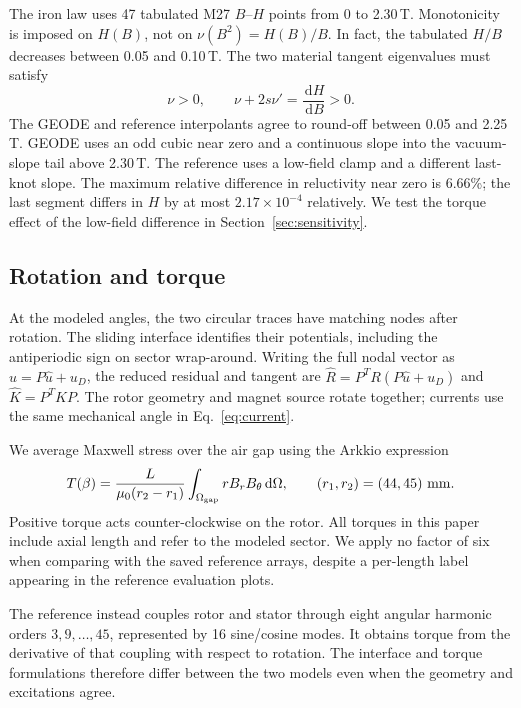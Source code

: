 \documentclass{anvil-paper}
\newcommand{\dd}{\,\mathrm{d}}
\begin{document}
The iron law uses 47 tabulated M27 $B$--$H$ points from 0 to 2.30\,T.
Monotonicity is imposed on $H(B)$, not on $\nu(B^2)=H(B)/B$.
In fact, the tabulated $H/B$ decreases between 0.05 and 0.10\,T.
The two material tangent eigenvalues must satisfy
\begin{equation}
 \nu>0,\qquad \nu+2s\nu'=\frac{\dd H}{\dd B}>0.
\end{equation}
The GEODE and reference interpolants agree to round-off between 0.05 and
2.25\,T. GEODE uses an odd cubic near zero and a continuous slope into the
vacuum-slope tail above 2.30\,T. The reference uses a low-field clamp and
a different last-knot slope. The maximum relative difference in
reluctivity near zero is 6.66\%; the last segment differs in $H$ by at
most $2.17\times10^{-4}$ relatively. We test the torque effect of the
low-field difference in Section~\ref{sec:sensitivity}.

\subsection{Rotation and torque}
At the modeled angles, the two circular traces have matching nodes after
rotation. The sliding interface identifies their potentials, including
the antiperiodic sign on sector wrap-around. Writing the full nodal vector
as $u=P\hat u+u_D$, the reduced residual and tangent are
$\hat R=P^T R(P\hat u+u_D)$ and $\hat K=P^T K P$.
The rotor geometry and magnet source rotate together; currents use the
same mechanical angle in Eq.~\eqref{eq:current}.

We average Maxwell stress over the air gap using the Arkkio expression
\begin{equation}
 T(\beta)=\frac{L}{\mu_0(r_2-r_1)}
  \int_{\Omega_{\rm gap}}r B_r B_\theta\dd\Omega,
 \qquad(r_1,r_2)=(44,45)\ {\rm mm}.
 \label{eq:torque}
\end{equation}
Positive torque acts counter-clockwise on the rotor. All torques in this
paper include axial length and refer to the modeled sector. We apply no
factor of six when comparing with the saved reference arrays, despite a
per-length label appearing in the reference evaluation plots.

The reference instead couples rotor and stator through eight angular
harmonic orders $3,9,\ldots,45$, represented by 16 sine/cosine modes.
It obtains torque from the derivative of that coupling with respect to
rotation. The interface and torque formulations therefore differ between
the two models even when the geometry and excitations agree.
\end{document}
